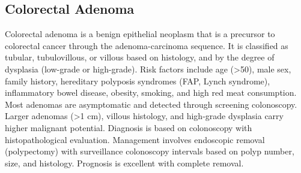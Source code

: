 



\label{sec:Colorectal Neoplasms}

\subsection{Colorectal Adenoma}
\label{sec:Colorectal Adenoma}
Colorectal adenoma is a benign epithelial neoplasm that is a precursor to colorectal cancer through the adenoma-carcinoma sequence. It is classified as tubular, tubulovillous, or villous based on histology, and by the degree of dysplasia (low-grade or high-grade). Risk factors include age (>50), male sex, family history, hereditary polyposis syndromes (FAP, Lynch syndrome), inflammatory bowel disease, obesity, smoking, and high red meat consumption. Most adenomas are asymptomatic and detected through screening colonoscopy. Larger adenomas (>1 cm), villous histology, and high-grade dysplasia carry higher malignant potential. Diagnosis is based on colonoscopy with histopathological evaluation. Management involves endoscopic removal (polypectomy) with surveillance colonoscopy intervals based on polyp number, size, and histology. Prognosis is excellent with complete removal.

